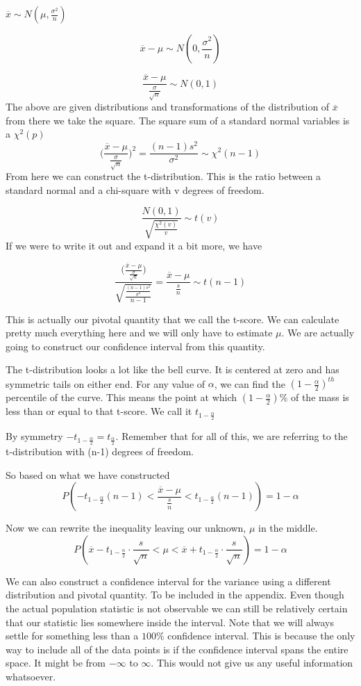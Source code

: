 $\overline{x} \sim N(\mu, \frac{\sigma^2}{n})$

\[\overline{x}-\mu \sim N(0, \frac{\sigma^2}{n})\]

\[\frac{\overline{x}-\mu}{\frac{\sigma}{\sqrt{n}}} \sim N(0,1)\]
The above are given distributions and transformations of the distribution of $\overline{x}$ from there we take the square. The square sum of a standard normal variables is a $\chi^2(p)$
\[\Big(\frac{\overline{x}-\mu}{\frac{\sigma}{\sqrt{n}}} \Big)^2= \frac{(n-1)s^2}{\sigma^2} \sim \chi^2(n-1)\]
From here we can construct the t-distribution. This is the ratio between a standard normal and a chi-square with v degrees of freedom.

\[\frac{N(0,1)}{\sqrt{\frac{\chi^2(v)}{v}}}\sim t(v)\]
If we were to write it out and expand it a bit more, we have

\[\frac{
    \Big(\frac{\overline{x}-\mu}{\frac{\sigma}{\sqrt{n}}} \Big)
    }
    {\sqrt{
    \frac{\frac{(n-1)s^2}{\sigma^2}}{n-1}
    }} = \frac{\overline{x}-\mu}{\frac{s}{n}}\sim t(n-1)\]

This is actually our pivotal quantity that we call the t-score. We can calculate pretty much everything here and we will only have to estimate $\mu$. We are actually going to construct our confidence interval from this quantity.


The t-distribution looks a lot like the bell curve. It is centered at zero and has symmetric tails on either end. For any value of $\alpha$, we can find the $(1-\frac{\alpha}{2})^{th}$ percentile of the curve. This means the point at which $(1-\frac{\alpha}{2})\%$ of the mass is less than or equal to that t-score. We call it $t_{1-\frac{\alpha}{2}}$

By symmetry $-t_{1-\frac{\alpha}{2}}= t_\frac{\alpha}{2}$. Remember that for all of this, we are referring to the t-distribution with (n-1) degrees of freedom.

So based on what we have constructed
\[P(-t_{1-\frac{\alpha}{2}}(n-1) < \frac{\overline{x}-\mu}{\frac{s}{n}}< t_{1-\frac{\alpha}{2}}(n-1))= 1-\alpha\]

Now we can rewrite the inequality leaving our unknown, $\mu$ in the middle.
\[P(\overline{x}-t_{1-\frac{\alpha}{2}}\cdot \frac{s}{\sqrt{n}} < \mu < \overline{x} + t_{1-\frac{\alpha}{2}}\cdot \frac{s}{\sqrt{n}})= 1-\alpha\]

We can also construct a confidence interval for the variance using a different distribution and pivotal quantity. To be included in the appendix. Even though the actual population statistic is not observable we can still be relatively certain that our statistic lies somewhere inside the interval. Note that we will always settle for something less than a $100\%$ confidence interval. This is because the only way to include all of the data points is if the confidence interval spans the entire space. It might be from $-\infty$ to $\infty$. This would not give us any useful information whatsoever.

